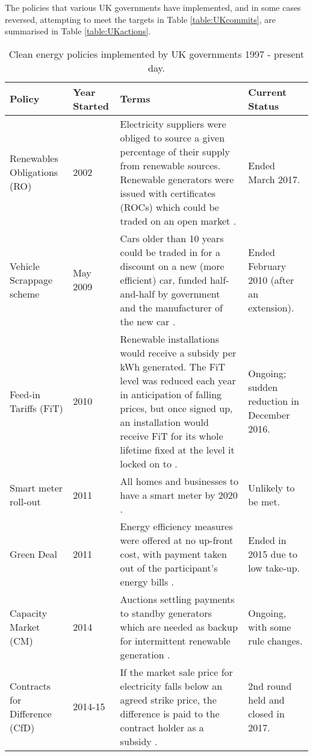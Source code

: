 \documentclass[report_18month.tex]{subfiles}
\begin{document}
The policies that various UK governments have implemented, and in some cases reversed, attempting to meet the targets in Table \ref{table:UKcommits}, are summarised in Table \ref{table:UKactions}.
\begin{longtable}{ M{2.4cm} M{1.3cm} M{7.6cm} M{3cm} }
\caption{Clean energy policies implemented by UK governments 1997 - present day.}\\
\renewcommand*{\arraystretch}{1.25}
\textbf{Policy} & \textbf{Year Started} & \textbf{Terms} & \textbf{Current Status} \\ 
\hline
Renewables Obligations (RO) & 2002 & Electricity suppliers were obliged to source a given percentage of their supply from renewable sources. Renewable generators were issued with certificates (ROCs) which could be traded on an open market \citep{ofgem2017roc}. & Ended March 2017. \\
\hline
Vehicle Scrappage scheme & May 2009 & Cars older than 10 years could be traded in for a  discount on a new (more efficient) car, funded half-and-half by government and the manufacturer of the new car \citep{harari2009vehiclescrap}. & Ended February 2010 (after an extension). \\
\hline
Feed-in Tariffs (FiT) & 2010 & Renewable installations would receive a subsidy per kWh generated. The FiT level was reduced each year in anticipation of falling prices, but once signed up, an installation would receive FiT for its whole lifetime fixed at the level it locked on to \citep{ofgem2017fit}. & Ongoing; sudden reduction in December 2016. \\
\hline
Smart meter roll-out & 2011 & All homes and businesses to have a smart meter by 2020 \citep{ofgem2017smartmeters}. & Unlikely to be met. \\
\hline
Green Deal & 2011 & Energy efficiency measures were offered at no up-front cost, with payment taken out of the participant's energy bills \citep{greendeal2017}. & Ended in 2015 due to low take-up. \\
\hline
Capacity Market (CM) & 2014 & Auctions settling payments to standby generators which are needed as backup for intermittent renewable generation \citep{mattholie2017cm}. & Ongoing, with some rule changes. \\
\hline
Contracts for Difference (CfD) & 2014-15 & If the market sale price for electricity falls below an agreed strike price, the difference is paid to the contract holder as a subsidy \citep{beis2017cfd}. & 2nd round held and closed in 2017. \\

\end{longtable}
\end{document}
